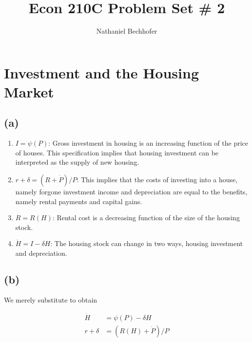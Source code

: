 \documentclass[11pt]{amsart}
\title{Econ 210C Problem Set \# 2}
\author{Nathaniel Bechhofer}
\begin{document}
\maketitle

\section{Investment and the Housing Market}

\subsection*{(a)}
\begin{enumerate}
	\item $I = \psi (P)$: Gross investment in housing is an increasing function of the price of houses. This specification implies that housing investment can be interpreted as the supply of new housing. 
	\item $r + \delta = (R + \dot{P})/P$: This implies that the costs of investing into a house, namely forgone investment income and depreciation are equal to the benefits, namely rental payments and capital gains. 
	\item $R = R(H)$: Rental cost is a decreasing function of the size of the housing stock. 
	\item $\dot{H} = I - \delta H$: The housing stock can change in two ways, housing investment and depreciation.
\end{enumerate}

\subsection*{(b)}

We merely substitute to obtain

\begin{align*}
\dot{H} &= \psi(P) - \delta H \\
r + \delta &= (R(H) + \dot{P}) / P
\end{align*}
\end{document}
